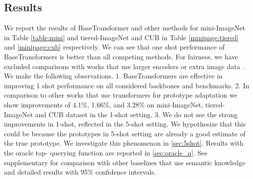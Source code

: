 \documentclass{bmvc2k}
\begin{document}
\subsection{Results}

We report the results of BaseTransformer and other methods for mini-ImageNet in Table \ref{table:mini} and tiered-ImageNet and CUB in Table \ref{minipage:tiered} and \ref{minipage:cub} respectively. We can see that one shot performance of BaseTransformers is better than all competing methods. For fairness, we have excluded comparisons with works that use larger encoders or extra image data \cite{yang2021free}.
We make the following observations. 1. BaseTransformers are effective in improving 1 shot performance on all considered backbones and benchmarks. 2. In comparison to other works \cite{ye2020few,hou2019cross} that use transformers for prototype adaptation we show improvements of 4.1\%, 1.66\%,  and 3.28\% on mini-ImageNet, tiered-ImageNet and CUB dataset in the 1-shot setting. 3. We do not see the strong improvements in 1-shot, reflected in the 5-shot setting. We hypothesize that this could be because the prototypes in 5-shot setting are already a good estimate of the true prototype. We investigate this phenomenon in \ref{sec:5shot}. Results with the oracle top- querying function are reported in \ref{sec:oracle_q}. See supplementary for comparison with other baselines that use semantic knowledge and detailed results with 95\% confidence intervals.
\end{document}
